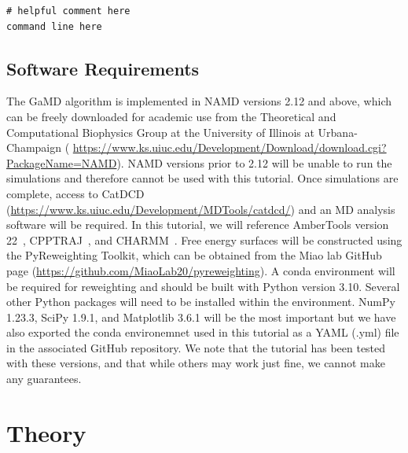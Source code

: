 \documentclass[9pt,tutorial]{livecoms}
\begin{document}
\begin{lstlisting}[label=example,caption=example\_code\_box.sh, basicstyle=\small, breaklines=true, backgroundcolor=\color{light-gray}]
# helpful comment here
command line here
\end{lstlisting}

\subsection{Software Requirements} The GaMD algorithm is implemented in NAMD versions 2.12 and above, which can be freely downloaded for academic use from the Theoretical and Computational Biophysics Group at the University of Illinois at Urbana-Champaign ( \url{https://www.ks.uiuc.edu/Development/Download/download.cgi?PackageName=NAMD}). NAMD versions prior to 2.12 will be unable to run the simulations and therefore cannot be used with this tutorial. Once simulations are complete, access to CatDCD (\url{https://www.ks.uiuc.edu/Development/MDTools/catdcd/}) and an MD analysis software will be required. In this tutorial, we will reference AmberTools version 22~\cite{case_ambertools_2023}, CPPTRAJ~\cite{roe_ptraj_2013}, and CHARMM~\cite{hwang_charmm_2024}. Free energy surfaces will be constructed using the PyReweighting Toolkit, which can be obtained from the Miao lab GitHub page (\url{https://github.com/MiaoLab20/pyreweighting}). A conda environment will be required for reweighting and should be built with Python version 3.10. Several other Python packages will need to be installed within the environment. NumPy 1.23.3, SciPy 1.9.1, and Matplotlib 3.6.1 will be the most important but we have also exported the conda environemnet used in this tutorial as a YAML (.yml) file in the associated GitHub repository. We note that the tutorial has been tested with these versions, and that while others may work just fine, we cannot make any guarantees.

\section{Theory} \label{sec:theory}
\end{document}
